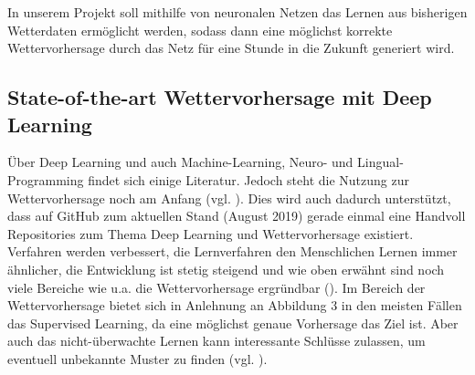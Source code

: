 In unserem Projekt soll mithilfe von neuronalen Netzen das Lernen aus bisherigen Wetterdaten ermöglicht werden, sodass dann eine möglichst korrekte Wettervorhersage durch das Netz für eine Stunde in die Zukunft generiert wird.

\subsection{State-of-the-art Wettervorhersage mit Deep Learning}

Über Deep Learning und auch Machine-Learning, Neuro- und Lingual-Programming findet sich einige Literatur. Jedoch steht die Nutzung zur Wettervorhersage noch am Anfang (vgl. \cite{ChristophFrohlich.2019}). Dies wird auch dadurch unterstützt, dass auf GitHub zum aktuellen Stand (August 2019) gerade einmal eine Handvoll Repositories zum Thema Deep Learning und Wettervorhersage existiert. Verfahren werden verbessert, die Lernverfahren den Menschlichen Lernen immer ähnlicher, die Entwicklung ist stetig steigend und wie oben erwähnt sind noch viele Bereiche wie u.a. die Wettervorhersage  ergründbar (\cite[S. 103]{Wick.2017}). Im Bereich der Wettervorhersage bietet sich in Anlehnung an Abbildung 3 in den meisten Fällen das Supervised Learning, da eine möglichst genaue Vorhersage das Ziel ist. Aber auch das  nicht-überwachte Lernen kann interessante Schlüsse zulassen, um eventuell unbekannte Muster zu finden (vgl. \cite[S. 371]{Welsch.2018}). 



